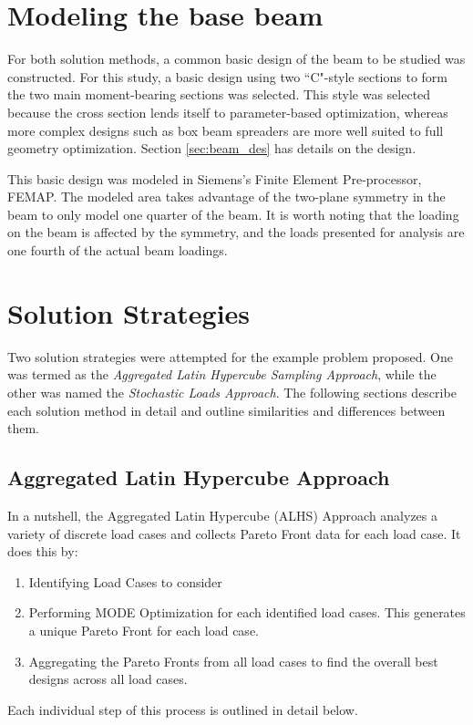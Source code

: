 \section{Modeling the base beam}
For both solution methods, a common basic design of the beam to be studied was constructed. For this study, a basic design using two ``C"-style sections to form the two main moment-bearing sections was selected. This style was selected because the cross section lends itself to parameter-based optimization, whereas more complex designs such as box beam spreaders are more well suited to full geometry optimization. Section \ref{sec:beam_des} has details on the design. 

This basic design was modeled in Siemens's Finite Element Pre-processor, FEMAP. The modeled area takes advantage of the two-plane symmetry in the beam to only model one quarter of the beam. It is worth noting that the loading on the beam is affected by the symmetry, and the loads presented for analysis are one fourth of the actual beam loadings. 

\section{Solution Strategies}
Two solution strategies were attempted for the example problem proposed. One was termed as the \emph{Aggregated Latin Hypercube Sampling Approach}, while the other was named the \emph{Stochastic Loads Approach}. The following sections describe each solution method in detail and outline similarities and differences between them. 

\subsection{Aggregated Latin Hypercube Approach}

In a nutshell, the Aggregated Latin Hypercube (ALHS) Approach analyzes a variety of discrete load cases and collects Pareto Front data for each load case. It does this by:

\begin{enumerate}
\item Identifying Load Cases to consider
\item Performing MODE Optimization for each identified load cases. This generates a unique Pareto Front for each load case. 
\item Aggregating the Pareto Fronts from all load cases to find the overall best designs across all load cases. 
\end{enumerate}
Each individual step of this process is outlined in detail below. 

